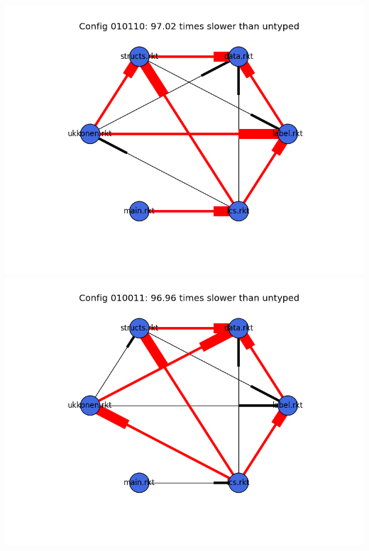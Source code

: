 \documentclass{article}
\begin{document}
\begin{itemize}
\includegraphics[width=\textwidth]{suffixtree-2015-04-02-module-graph-010110.png}
\includegraphics[width=\textwidth]{suffixtree-2015-04-02-module-graph-010011.png}
\end{itemize}
\end{document}
